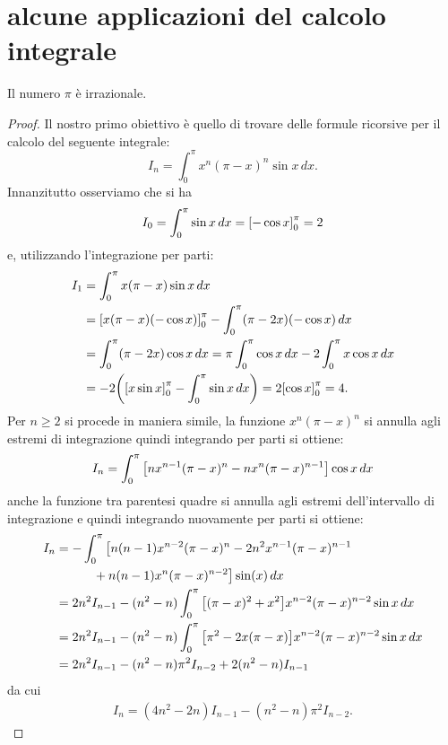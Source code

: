 \section{alcune applicazioni del calcolo integrale}

\begin{theorem}[irrazionalità di $\pi$]
Il numero $\pi$ è irrazionale.
\end{theorem}
%
\begin{proof}
Il nostro primo obiettivo è quello di trovare delle formule
ricorsive per il calcolo del seguente integrale:
\[
  I_n = \int_0^\pi x^n (\pi-x)^n \sin x\, dx.
\]
Innanzitutto osserviamo che si ha
\[
  I_0 = \int_0^\pi \sin x\, dx = {\left[ -\cos x \right]}_0^\pi = 2
\]
e, utilizzando l'integrazione per parti:
\begin{align*}
  I_1 &= \int_0^\pi x(\pi-x)\sin x\, dx\\
      &= {\left[ x(\pi-x)(-\cos x) \right]}_0^\pi
       -\int_0^\pi (\pi-2x)(-\cos x)\, dx \\
      &= \int_0^\pi (\pi-2x)\cos x\, dx
      = \pi \int_0^\pi \cos x\, dx - 2 \int_0^\pi x\cos x\, dx \\
      &= - 2 {\left( {\left[ x\sin x \right]}_0^\pi - \int_0^\pi \sin x\, dx \right)}
      = 2 {\left[ \cos x \right]}_0^\pi = 4.
\end{align*}
Per $n\ge 2$ si procede in maniera simile,
la funzione $x^n (\pi-x)^n$ si
annulla agli estremi di integrazione quindi integrando per parti
 si ottiene:
\[
  I_n = \int_0^\pi {\left[ n x^{n-1}(\pi-x)^n - n x^n (\pi-x)^{n-1} \right]} \cos x\, dx
\]
anche la funzione tra parentesi quadre si annulla
agli estremi dell'intervallo di integrazione e quindi integrando nuovamente
per parti si ottiene:
\begin{align*}
  I_n &= -\int_0^\pi \big[n(n-1) x^{n-2}(\pi-x)^n
    - 2n^2 x^{n-1}(\pi-x)^{n-1} \\
  &\qquad\quad   + n(n-1) x^n(\pi-x)^{n-2}\big] \sin(x)\, dx \\
  &= 2n^2 I_{n-1} - (n^2-n) \int_0^\pi {\left[ (\pi-x)^2 + x^2 \right]}x^{n-2}(\pi-x)^{n-2} \sin x\, dx \\
  &= 2n^2 I_{n-1} - (n^2-n) \int_0^\pi {\left[ \pi^2 - 2x(\pi-x) \right]}x^{n-2}(\pi-x)^{n-2}\sin x\, dx \\
  &= 2n^2 I_{n-1} - (n^2-n) \pi^2 I_{n-2} + 2(n^2-n) I_{n-1}
\end{align*}
da cui
\begin{align}\label{eq:9530978}
   I_n = (4n^2-2n)I_{n-1} -(n^2-n)\pi^2 I_{n-2}.
\end{align}


\end{proof}
